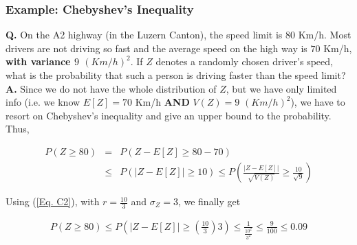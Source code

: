 \documentclass[notes=show,smaller,handout]{beamer}\usepackage[]{graphicx}\usepackage[]{color}
\begin{document}
\begin{frame}%



\frametitle{Example: Chebyshev's Inequality}

\begin{example}

\textbf{Q.} On the A2 highway (in the Luzern Canton), the speed limit is $80$ Km/h. Most drivers are not driving so fast and the average speed on the high way is $70$ Km/h, \textbf{with variance $9$ $(Km/h)^2$}.
If $Z$ denotes a randomly chosen driver's speed, what is the probability that such a person is driving faster than the speed limit? \\
\vspace{0.25cm}
\textbf{A.} Since we do not have the whole distribution of $Z$, but we have only limited info (i.e. we know $E[Z]=70$ Km/h \textbf{AND} $V(Z)=9$ $(Km/h)^2$), we have to resort on Chebyshev's inequality and give an upper bound to the probability. Thus,
\begin{small}
\begin{eqnarray*}
P( Z \geq 80) &=& P( Z - E[Z]\geq 80 - 70) \\ &\leq& P(\vert Z-E[Z] \vert \geq 10) \leq  P\left( \frac{\vert Z-E[Z] \vert }{\sqrt{V(Z)}}\geq \frac{10}{\sqrt{9}}\right)
\end{eqnarray*}
\end{small}

Using (\ref{Eq. C2}), with $r=\frac{10}{3}$ and $\sigma_Z= 3$, we finally get
\begin{small}
\begin{eqnarray*}
P( Z \geq 80) \leq P\left(\Big\vert Z-E[Z] \Big\vert \geq \left(\frac{10}{3}\right) {3}\right) \leq \frac{1}{\frac{10^2}{3^2}} \leq \frac{9}{100} \leq 0.09
\end{eqnarray*}
\end{small}

\end{example}

\end{frame}%
\end{document}

